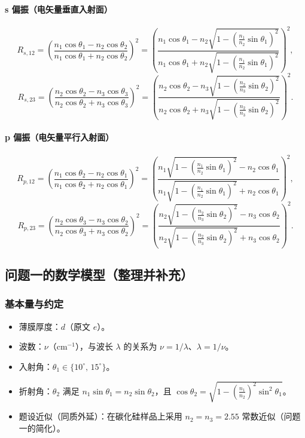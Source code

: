 \documentclass[withoutpreface,bwprint]{cumcmthesis} %
\begin{document}
\paragraph{s 偏振（电矢量垂直入射面）}
\[
    R_{s,12}=\left(\frac{n_1\cos\theta_1 - n_2\cos\theta_2}{n_1\cos\theta_1 + n_2\cos\theta_2}\right)^2
    =\left(\frac{n_1\cos\theta_1 - n_2\sqrt{1-(\tfrac{n_1}{n_2}\sin\theta_1)^2}}{n_1\cos\theta_1 + n_2\sqrt{1-(\tfrac{n_1}{n_2}\sin\theta_1)^2}}\right)^2,
\]
\[
    R_{s,23}=\left(\frac{n_2\cos\theta_2 - n_3\cos\theta_3}{n_2\cos\theta_2 + n_3\cos\theta_3}\right)^2
    =\left(\frac{n_2\cos\theta_2 - n_3\sqrt{1-(\tfrac{n_2}{n_3}\sin\theta_2)^2}}{n_2\cos\theta_2 + n_3\sqrt{1-(\tfrac{n_2}{n_3}\sin\theta_2)^2}}\right)^2.
\]
\paragraph{p 偏振（电矢量平行入射面）}
\[
    R_{p,12}=\left(\frac{n_1\cos\theta_2 - n_2\cos\theta_1}{n_1\cos\theta_2 + n_2\cos\theta_1}\right)^2
    =\left(\frac{n_1\sqrt{1-(\tfrac{n_1}{n_2}\sin\theta_1)^2} - n_2\cos\theta_1}{n_1\sqrt{1-(\tfrac{n_1}{n_2}\sin\theta_1)^2} + n_2\cos\theta_1}\right)^2,
\]
\[
    R_{p,23}=\left(\frac{n_2\cos\theta_3 - n_3\cos\theta_2}{n_2\cos\theta_3 + n_3\cos\theta_2}\right)^2
    =\left(\frac{n_2\sqrt{1-(\tfrac{n_2}{n_3}\sin\theta_2)^2} - n_3\cos\theta_2}{n_2\sqrt{1-(\tfrac{n_2}{n_3}\sin\theta_2)^2} + n_3\cos\theta_2}\right)^2.
\]

\subsection{问题一的数学模型（整理并补充）}
\subsubsection{基本量与约定}
\begin{itemize}
    \item 薄膜厚度：\(d\)（原文 \(e\)）。
    \item 波数：\(\nu\)（cm\(^{-1}\)），与波长 \(\lambda\) 的关系为 \(\nu=1/\lambda\)、\(\lambda=1/\nu\)。
    \item 入射角：\(\theta_1\in\{10^\circ,\,15^\circ\}\)。
    \item 折射角：\(\theta_2\) 满足 \(n_1\sin\theta_1=n_2\sin\theta_2\)，且 \(\cos\theta_2=\sqrt{1-(\tfrac{n_1}{n_2})^2\sin^2\theta_1}\)。
    \item 题设近似（同质外延）：在碳化硅样品上采用 \(n_2=n_3=2.55\) 常数近似（问题一的简化）。
\end{itemize}
\end{document}
